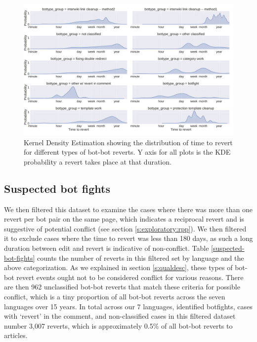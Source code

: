 \documentclass[format=acmsmall, review=false, screen=true]{acmart}%
\begin{document}
\begin{figure}[H]
\includegraphics[width=\textwidth]{figures/ttr-categorized.pdf}
\caption{Kernel Density Estimation showing the distribution of time to revert for different types of bot-bot reverts. Y axis for all plots is the KDE probability a revert takes place at that duration.}
\label{fig:ttr-type}
\end{figure}

\subsection{Suspected bot fights}  
We then filtered this dataset to examine the cases where there was more than one revert per bot pair on the same page, which indicates a reciprocal revert and is suggestive of potential conflict (see section \ref{s:exploratory:rpp}). We then filtered it to exclude cases where the time to revert was less than 180 days, as such a long duration between edit and revert is indicative of non-conflict. Table \ref{suspected-bot-fights} counts the number of reverts in this filtered set by language and the above categorization. As we explained in section \ref{s:qualdesc}, these types of bot-bot revert events ought not to be considered conflict for various reasons. There are then 962 unclassified bot-bot reverts that match these criteria for possible conflict, which is a tiny proportion of all bot-bot reverts across the seven languages over 15 years. In total  across our 7 languages, identified botfights, cases with `revert' in the comment, and non-classified cases in this filtered dataset number 3,007 reverts, which is approximately 0.5\% of all bot-bot reverts to articles.
\end{document}
